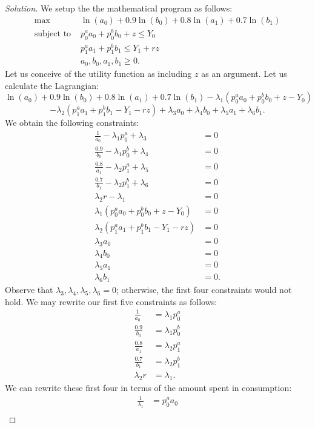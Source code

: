 \documentclass[12pt]{article}
\theoremstyle{definition}
\theoremstyle{remark}
\def\la{\lambda}
\begin{document}
\begin{proof}[Solution]
  We setup the the mathematical program as follows:
  \begin{align*}
    \max &\ln(a_0) + 0.9 \ln(b_0) + 0.8 \ln(a_1) + 0.7 \ln(b_1) \\
    \text{subject to } &p_0^aa_0 + p_0^bb_0 + z \leq Y_0 \\
    &p_1^aa_1 + p_1^bb_1 \leq Y_1 + rz \\
    &a_0, b_0, a_1, b_1 \geq 0.
  \end{align*}
  Let us conceive of the utility function as including $z$ as an argument. Let us calculate the Lagrangian:
  $$ \ln(a_0) + 0.9 \ln(b_0) + 0.8 \ln(a_1) + 0.7 \ln(b_1) - \la_1(p_0^aa_0 + p_0^bb_0 + z - Y_0)$$
  $$ - \la_2(p_1^aa_1 + p_1^bb_1 - Y_1 - rz) + \la_3a_0 + \la_4b_0 + \la_5a_1 + \la_6b_1. $$
  We obtain the following constraints:
  \begin{align*}
    \frac{1}{a_0} - \la_1p_0^a + \la_3 &= 0 \\
    \frac{0.9}{b_0} - \la_1p_0^b + \la_4 &= 0 \\
    \frac{0.8}{a_1} - \la_2p_1^a + \la_5 &= 0 \\
    \frac{0.7}{b_1} - \la_2p_1^b + \la_6 &= 0 \\
    \la_2r - \la_1 &= 0 \\
    \la_1(p_0^aa_0 + p_0^bb_0 + z - Y_0) &= 0 \\
    \la_2(p_1^aa_1 + p_1^bb_1 - Y_1 - rz) &= 0 \\
    \la_3a_0 &= 0 \\
    \la_4b_0 &= 0 \\
    \la_5a_1 &= 0 \\
    \la_6b_1 &= 0.
  \end{align*}
  Observe that $\la_3, \la_4, \la_5, \la_6 = 0$; otherwise, the first four constraints would not hold.
  We may rewrite our first five constraints as follows:
  \begin{align*}
    \frac{1}{a_0} &= \la_1p_0^a \\
    \frac{0.9}{b_0} &= \la_1p_0^b \\
    \frac{0.8}{a_1} &= \la_2p_1^a \\
    \frac{0.7}{b_1} &= \la_2p_1^b \\
    \la_2r &= \la_1.
  \end{align*}
  We can rewrite these first four in terms of the amount spent in consumption:
  \begin{align*}
    \frac{1}{\la_1} &= p_0^aa_0 \\

\end{align*}
\end{proof}
\end{document}
